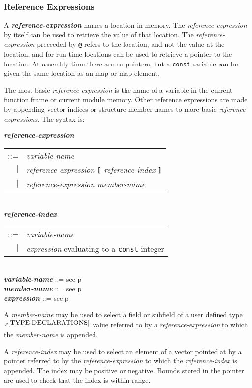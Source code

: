 \documentclass[12pt]{article}
\newcommand{\TT}[1]{{\tt \bfseries #1}}
\newcommand{\emkey}[1]{{\em \bfseries #1}}
\newcommand{\pagref}[1]{p\pageref{#1}}
\newcommand{\pagnote}[1]{$\,^{p\pageref{#1}}$}
\newenvironment{indpar}[1][0.3in]%
	{\begin{list}{}%
		     {\setlength{\itemsep}{0in}%
		      \setlength{\topsep}{0in}%
		      \setlength{\parsep}{1ex}%
		      \setlength{\labelwidth}{#1}%
		      \setlength{\leftmargin}{#1}%
		      \addtolength{\leftmargin}{\labelsep}}%
	 \item}%
	{\end{list}}
\begin{document}
\subsubsection{Reference Expressions}
\label{REFERENCE-EXPRESSIONS}

A \emkey{reference-expression} names a location in memory.
The {\em reference-expression} by itself can be used to retrieve
the value of that location.  The {\em reference-expression}
preceeded by \TT{@} refers to the location, and not the value
at the location, and for run-time locations can be used to retrieve
a pointer to the location.  At assembly-time there
are no pointers, but a {\tt const} variable can be given the
same location as an map or map element.

The most basic {\em reference-expression} is the name of a variable
in the current function frame or current module memory.  Other
reference expressions are made by appending vector indices or structure
member names to more basic {\em reference-expressions}.  The syntax
is:

\begin{indpar}
\emkey{reference-expression}
    \begin{tabular}[t]{rl}
    ::= & {\em variable-name} \\
    $|$ & {\em reference-expression} \TT{[} {\em reference-index} \TT{]} \\
    $|$ & {\em reference-expression} {\em member-name} \\
    \end{tabular}
\\[0.5ex]
\emkey{reference-index}
    \begin{tabular}[t]{rl}
    ::= & {\em variable-name} \\
    $|$ & {\em expression} evaluating to a {\tt const} integer
    \end{tabular}
\\[0.5ex]
\emkey{variable-name} ::= see \pagref{VARIABLE-NAME}
\\[0.5ex]
\emkey{member-name} ::= see \pagref{MEMBER-NAME}
\\[0.5ex]
\emkey{expression} ::= see \pagref{EXPRESSION}
\end{indpar}

A {\em member-name} may be used to select a field or subfield
of a user defined type\pagnote{TYPE-DECLARATIONS} value referred
to by a {\em reference-expression}
to which the {\em member-name} is appended.

A {\em reference-index} may be used to select an element of a vector
pointed at by a pointer referred to by the
{\em reference-expression}
to which the {\em reference-index} is appended.  The index may be
positive or negative.  Bounds stored in the pointer are used to
check that the index is within range.
\end{document}
